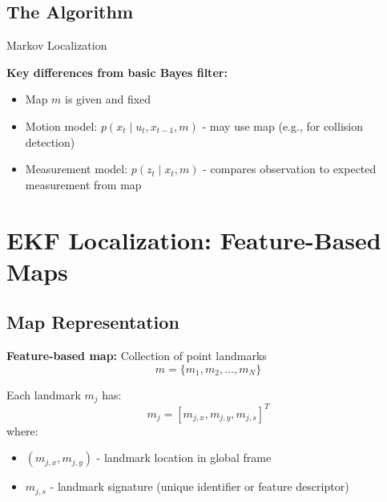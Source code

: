 \subsection{The Algorithm}

\begin{algorithm}[H]
\caption{Markov Localization}

\BlankLine
{}

\BlankLine
{}

\BlankLine
{}
\end{algorithm}

\textbf{Key differences from basic Bayes filter:}
\begin{itemize}
    \item Map $m$ is given and fixed
    \item Motion model: $p(x_t \mid u_t, x_{t-1}, m)$ - may use map (e.g., for collision detection)
    \item Measurement model: $p(z_t \mid x_t, m)$ - compares observation to expected measurement from map
\end{itemize}

\section{EKF Localization: Feature-Based Maps}

\subsection{Map Representation}

\textbf{Feature-based map:} Collection of point landmarks
\begin{equation}
m = \{m_1, m_2, \ldots, m_N\}
\end{equation}

Each landmark $m_j$ has:
\begin{equation}
m_j = [m_{j,x}, m_{j,y}, m_{j,s}]^T
\end{equation}
where:
\begin{itemize}
    \item $(m_{j,x}, m_{j,y})$ - landmark location in global frame
    \item $m_{j,s}$ - landmark signature (unique identifier or feature descriptor)
\end{itemize}


